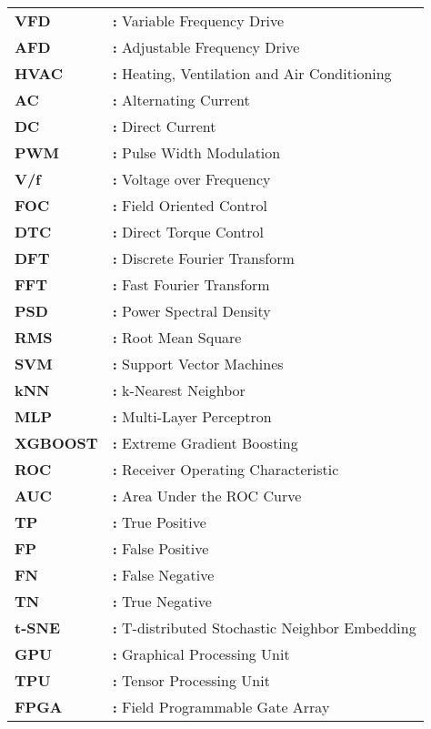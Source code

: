 \begin{tabular}{@{}p{2cm}l}
{\bf{VFD}} & {\bf:} Variable Frequency Drive\\
{\bf AFD} & {\bf:} Adjustable Frequency Drive\\
{\bf HVAC} & {\bf:} Heating, Ventilation and Air Conditioning\\
{\bf AC} & {\bf:} Alternating Current\\
{\bf DC} & {\bf:} Direct Current\\
{\bf PWM} & {\bf:} Pulse Width Modulation\\
{\bf V/f} & {\bf:} Voltage over Frequency\\
{\bf FOC} & {\bf:} Field Oriented Control\\
{\bf DTC} & {\bf:} Direct Torque Control\\
{\bf DFT} & {\bf:} Discrete Fourier Transform\\
{\bf FFT} & {\bf:} Fast Fourier Transform\\
{\bf PSD} & {\bf:} Power Spectral Density\\
{\bf RMS} & {\bf:} Root Mean Square\\
{\bf SVM} & {\bf:} Support Vector Machines\\
{\bf kNN} & {\bf:} k-Nearest Neighbor\\
{\bf MLP} & {\bf:} Multi-Layer Perceptron\\
{\bf XGBOOST} & {\bf:} Extreme Gradient Boosting\\
{\bf ROC} & {\bf:} Receiver Operating Characteristic\\
{\bf AUC} & {\bf:}  Area Under the ROC Curve\\
{\bf TP} & {\bf:} True Positive\\
{\bf FP} & {\bf:} False Positive\\
{\bf FN} & {\bf:} False Negative\\
{\bf TN} & {\bf:} True Negative\\
{\bf t-SNE} & {\bf:} T-distributed Stochastic Neighbor Embedding\\
{\bf GPU} & {\bf:} Graphical Processing Unit\\
{\bf TPU} & {\bf:} Tensor Processing Unit\\
{\bf FPGA} & {\bf:} Field Programmable Gate Array\\
\end{tabular}

